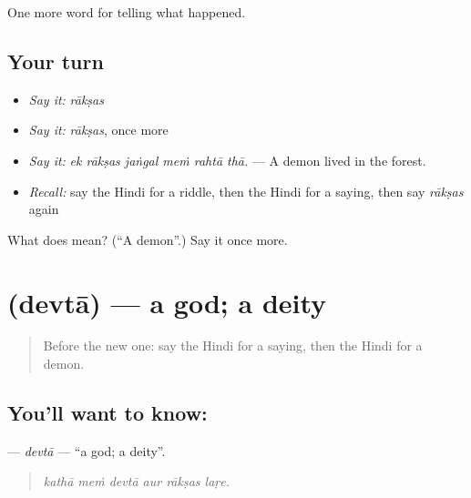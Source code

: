 \begin{grammarlens}[title={What you've built}]
One more word for telling what happened.
\end{grammarlens}

\subsection*{Your turn}
\begin{itemize}
\raggedright
  \item \emph{Say it:} \emph{rākṣas}
  \item \emph{Say it:} \emph{rākṣas}, once more
  \item \emph{Say it:} \emph{ek rākṣas jaṅgal meṁ rahtā thā.} — A demon lived in the forest.
  \item \emph{Recall:} say the Hindi for a riddle, then the Hindi for a saying, then say \emph{rākṣas} again
\end{itemize}

\begin{tcolorbox}[breakable,colback=teal!4,colframe=teal!35!black,title={Before you move on}]
What does  mean? (\textquotedblleft{}A demon\textquotedblright{}.) Say it once more.
\end{tcolorbox}
\section[\texorpdfstring{\hi{देवता} (devtā)}{देवता (devtā)}]{ (devtā) — a god; a deity}

\label{lesson:HI-C335-devta}



\begin{quote}
Before the new one: say the Hindi for a saying, then the Hindi for a demon.
\end{quote}

\subsection*{You'll want to know: }
\textbf{} — \emph{devtā} — \textquotedblleft{}a god; a deity\textquotedblright{}.

\begin{quote}
     
\end{quote}

\begin{quote}
\emph{kathā meṁ devtā aur rākṣas laṛe.}
\end{quote}

